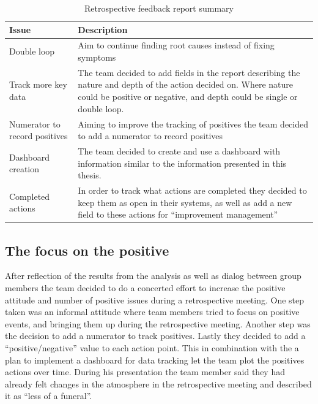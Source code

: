 \begin{table}[!h]
	\begin{center}
	\caption{Retrospective feedback report summary}
	\label{table:Retrospective-Feedback-four}
	\begin{tabular}{ l  p{} }
	\hline
	Issue & Description \\
	\hline
	Double loop & Aim to continue finding root causes instead of fixing symptoms \\
	Track more key data & The team decided to add fields in the report describing the nature and depth of the action decided on. Where nature could be positive or negative, and depth could be single or double loop.\\
	Numerator to record positives & Aiming to improve the tracking of positives the team decided to add a numerator to record positives \\
	Dashboard creation & The team decided to create and use a dashboard with information similar to the information presented in this thesis.  \\
	Completed actions & In order to track what actions are completed they decided to keep them as open in their systems, as well as add a new field to these actions for ``improvement management'' \\
	\hline
	\end{tabular}
	\end{center}
\end{table}



\subsection{The focus on the positive}
After reflection of the results from the analysis as well as dialog between group members the team decided to do a concerted effort to increase the positive attitude and number of positive issues during a retrospective meeting. One step taken was an informal attitude where team members tried to focus on positive events, and bringing them up during the retrospective meeting. Another step was the decision to add a numerator to track positives. Lastly they decided to add a ``positive/negative'' value to each action point. This in combination with the a plan to implement a dashboard for data tracking let the team plot the positives actions over time. During his presentation the team member said they had already felt changes in the atmosphere in the retrospective meeting and described it as ``less of a funeral''. 

